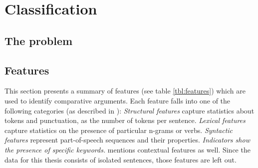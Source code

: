 \chapter{Classification}
\section{The problem}
\section{Features}
\label{sec:features}
This section presents a summary of features (see table \ref{tbl:features}) which are used to identify comparative arguments.  Each feature falls into one of the following categories (as described in \cite{Aker2017What-works-and-}): \emph{Structural features} capture statistics about tokens and punctuation, as the number of tokens per sentence. \emph{Lexical features} capture statistics on the presence of particular n-grams or verbs. \emph{Syntactic features} represent part-of-speech sequences and their properties. \emph{Indicators show the presence of specific keywords.}
\cite{Aker2017What-works-and-} mentions contextual features as well. Since the data for this thesis consists of isolated sentences, those features are left out.

